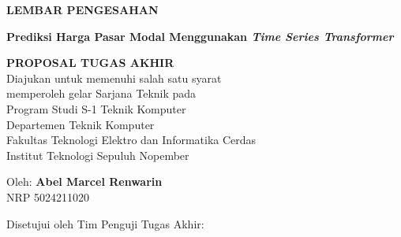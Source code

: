 \begin{center}
  \large
  \textbf{LEMBAR PENGESAHAN}
\end{center}

\thispagestyle{empty}

\begin{center}
    \textbf{Prediksi Harga Pasar Modal Menggunakan \emph{Time Series Transformer}}
\end{center}

\begingroup
\small

\begin{center}
  \textbf{PROPOSAL TUGAS AKHIR}
  \\Diajukan untuk memenuhi salah satu syarat \\
  memperoleh gelar Sarjana Teknik pada \\
  Program Studi S-1 Teknik Komputer \\
  Departemen Teknik Komputer \\
  Fakultas {Teknologi Elektro dan Informatika Cerdas} \\
  Institut Teknologi Sepuluh Nopember
\end{center}

\begin{center}
  Oleh: \textbf{Abel Marcel Renwarin}
  \\NRP {5024211020}
\end{center}

\begin{center}
  Disetujui oleh Tim Penguji Tugas Akhir:
\end{center}

\begingroup
\setlength{\tabcolsep}{0pt}

